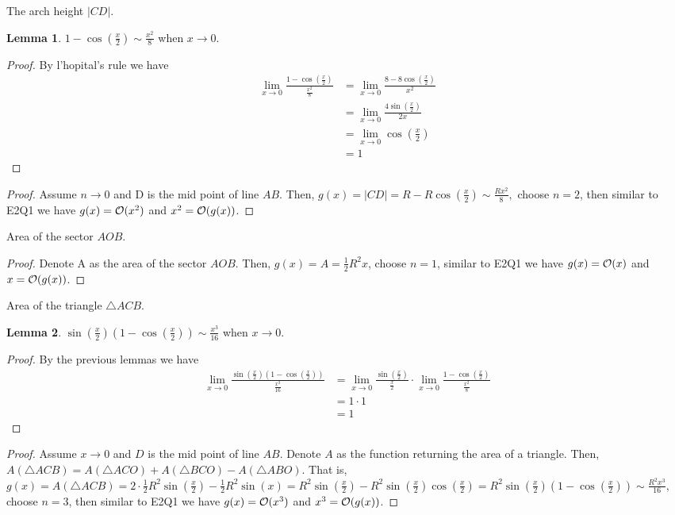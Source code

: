 \documentclass{homework}
\newcommand{\?}{\stackrel{?}{=}}
\theoremstyle{definition}
\newtheorem*{lemma}{Lemma}
\begin{document}
\question[2] The arch height $|CD|$.

\begin{lemma}
    $1-\cos(\frac{x}2)\sim \frac{x^2}8$ when $x\to0$.

    \begin{proof}
        By l'hopital's rule we have \begin{align*}
            \lim_{x\to0}\frac{1-\cos(\frac{x}2)}{\frac{x^2}8}&=\lim_{x\to0}\frac{8-8\cos(\frac{x}2)}{x^2}\\
            &=\lim_{x\to0}\frac{4\sin(\frac{x}2)}{2x}\\
            &=\lim_{x\to0}\cos(\frac{x}2)\\
            &=1
        \end{align*}
    \end{proof}
\end{lemma}

\begin{proof}
    Assume $n\to0$ and D is the mid point of line $AB$. Then, $g(x)=|CD|=R-R\cos(\frac{x}2)\sim \frac{Rx^2}{8},$ choose $n=2$, then similar to E2Q1 we have $g(x)=\cal{O}(x^2)$ and $x^2=\cal{O}(g(x))$. 
\end{proof}

\question[3] Area of the sector $AOB$.

\begin{proof}
    Denote A as the area of the sector $AOB$. Then, $g(x)=A=\frac12R^2x$, choose $n=1$, similar to E2Q1 we have $g(x)=\cal{O}(x)$ and $x=\cal{O}(g(x))$. 
\end{proof}

\question[4] Area of the triangle $\triangle ACB$.

\begin{lemma}
    $\sin(\frac{x}2)(1-\cos(\frac{x}2))\sim \frac{x^3}{16}$ when $x\to0$.

    \begin{proof}
        By the previous lemmas we have \begin{align*}
            \lim_{x\to0}\frac{\sin(\frac{x}2)(1-\cos(\frac{x}2))}{\frac{x^3}{16}}&=\lim_{x\to0}\frac{\sin(\frac{x}2)}{\frac{x}{2}}\cdot\lim_{x\to0}\frac{1-\cos(\frac{x}2)}{\frac{x^2}{8}}\\
            &=1\cdot1\\
            &=1
        \end{align*}
    \end{proof}
\end{lemma}

\begin{proof}
    Assume $x\to0$ and $D$ is the mid point of line $AB$. Denote $A$ as the function returning the area of a triangle. Then, $A(\triangle ACB)=A(\triangle ACO)+A(\triangle BCO)-A(\triangle ABO)$. That is, $g(x)=A(\triangle ACB)=2\cdot\frac12R^2\sin(\frac{x}2)-\frac12R^2\sin(x)=R^2\sin(\frac{x}2)-R^2\sin(\frac{x}2)\cos(\frac{x}{2})=R^2\sin(\frac{x}2)(1-\cos(\frac{x}{2}))\sim \frac{R^2x^3}{16}$, choose $n=3$, then similar to E2Q1 we have $g(x)=\cal{O}(x^3)$ and $x^3=\cal{O}(g(x))$.
\end{proof}
\end{document}
